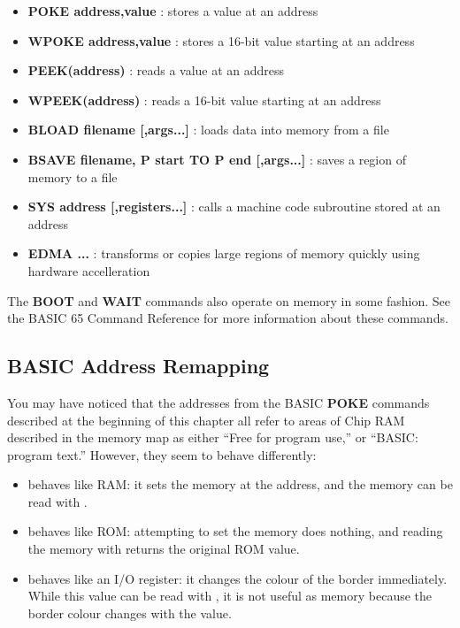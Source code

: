\begin{itemize}
\item {\bf POKE address,value} : stores a value at an address
\item {\bf WPOKE address,value} : stores a 16-bit value starting at an address
\item {\bf PEEK(address)} : reads a value at an address
\item {\bf WPEEK(address)} : reads a 16-bit value starting at an address
\item {\bf BLOAD filename [,args...]} : loads data into memory from a file
\item {\bf BSAVE filename, P start TO P end [,args...]} : saves a region of memory to a file
\item {\bf SYS address [,registers...]} : calls a machine code subroutine
stored at an address
\item {\bf EDMA ...} : transforms or copies large regions of memory quickly
using hardware accelleration
\end{itemize}

The {\bf BOOT} and {\bf WAIT} commands also operate on memory in some fashion.
See the BASIC 65 Command Reference for more information about these commands.

\subsection{BASIC Address Remapping}

You may have noticed that the addresses from the BASIC {\bf POKE} commands
described at the beginning of this chapter all refer to areas of Chip
RAM described in the memory map as either ``Free for program use,'' or ``BASIC:
program text.'' However, they seem to behave differently:

\begin{itemize}
\item {} behaves like RAM: it sets the memory at the address,
and the memory can be read with .
\item {} behaves like ROM: attempting to set the memory does nothing,
and reading the memory with  returns the original ROM value.
\item {} behaves like an I/O register: it changes the colour of
the border immediately. While this value can be read with , it is not useful as memory because the border colour changes with the value.
\end{itemize}

